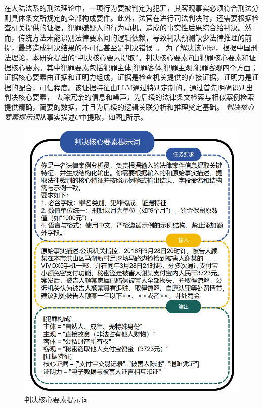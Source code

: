 在大陆法系的刑法理论中，一项行为要被判定为犯罪，其客观事实必须符合刑法分则具体条文所规定的全部构成要件。此外，法官在进行司法判决时，还需要根据检查机关提供的证据，犯罪嫌疑人的行为动机，造成的事实性后果综合给判决。然而，传统方法未能识别法律要素间的逻辑依赖，导致判决预测缺少法律推理的前提，最终造成判决结果的不可信甚至是判决错误~\cite{JSJA202505027,zhao2022charge,zhao2022charge}。
为了解决该问题，根据中国刑法理论，本研究提出的“判决核心要素提取”。判决核心要素$F$由犯罪核心要素和证据核心要素。其中犯罪要素包括犯罪主体,犯罪客体,犯罪主观,犯罪客观四个方面；证据核心要素由证据和证明力组成，证据是检查机关提供的直接证据，证明力是证据的配合，可信程度。该证据特征由LLM通过特别定制的。通过首先明确识别出判决核心要素， 去除冗余的信息和噪声，为后续的法律条文检索与相似案例检索提供精确，简要的数据，并且为后续的逻辑关联分析和推理奠定基础。
\textit{判决核心要素提示词}从事实描述$C$中提取，如图\ref{fig:prompt1}所示。
\begin{figure}[H]
	\centering
	\includegraphics[width=1\linewidth]{fig/prompt1.2.pdf}
	\caption{判决核心要素提示词}
	\label{fig:prompt1}
\end{figure}
